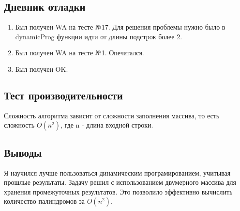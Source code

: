 \documentclass[12pt]{article}
\begin{document}
\newpage
\subsection*{Дневник отладки}

\begin{enumerate}
    \item Был получен WA на тесте №17. Для решения проблемы нужно было в dynamicProg функции идти от длины подстрок более 2.
    \item Был получен WA на тесте №1. Опечатался.
    \item Был получен OK.
\end{enumerate}

\newpage
\subsection*{Тест производительности}

Сложность алгоритма зависит от сложности заполнения массива, то есть сложность $O(n^2)$, где n - длина входной строки.



\newpage
\subsection*{Выводы}

Я научился лучше пользоваться динамическим програмированием, учитывая прошлые результаты. Задачу решил с использованием двумерного массива для хранения промежуточных результатов. Это позволило эффективно вычислить количество палиндромов за $O(n^2)$.
\end{document}

